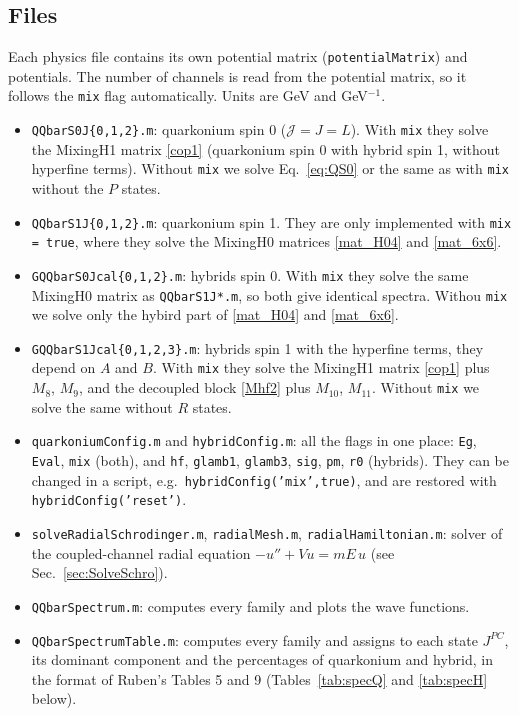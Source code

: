 \documentclass[11pt, a4paper]{article}
\begin{document}
\subsection{Files}
Each physics file contains its own potential matrix (\texttt{potentialMatrix}) and potentials. The number of channels is read from the potential matrix, so it follows the \texttt{mix} flag automatically. Units are GeV and GeV$^{-1}$.
\begin{itemize}
    \item \texttt{QQbarS0J\{0,1,2\}.m}: quarkonium spin 0 ($\mathcal{J}=J=L$). With \texttt{mix} they solve the MixingH1 matrix \eqref{cop1} (quarkonium spin 0 with hybrid spin 1, without hyperfine terms). Without \texttt{mix} we solve Eq.~\eqref{eq:QS0} or the same as with \texttt{mix} without the $P$ states.
    \item \texttt{QQbarS1J\{0,1,2\}.m}: quarkonium spin 1. They are only implemented with \texttt{mix = true}, where they solve the MixingH0 matrices \eqref{mat_H04} and \eqref{mat_6x6}.
    \item \texttt{GQQbarS0Jcal\{0,1,2\}.m}: hybrids spin 0. With \texttt{mix} they solve the same MixingH0 matrix as \texttt{QQbarS1J*.m}, so both give identical spectra. Withou \texttt{mix} we solve only the hybird part of \eqref{mat_H04} and \eqref{mat_6x6}.
    \item \texttt{GQQbarS1Jcal\{0,1,2,3\}.m}: hybrids spin 1 with the hyperfine terms, they depend on $A$ and $B$. With \texttt{mix} they solve the MixingH1 matrix \eqref{cop1} plus $M_8$, $M_9$, and the decoupled block \eqref{Mhf2} plus $M_{10}$, $M_{11}$. Without \texttt{mix} we solve the same without $R$ states.
    \item \texttt{quarkoniumConfig.m} and \texttt{hybridConfig.m}: all the flags in one place: \texttt{Eg}, \texttt{Eval}, \texttt{mix} (both), and \texttt{hf}, \texttt{glamb1}, \texttt{glamb3}, \texttt{sig}, \texttt{pm}, \texttt{r0} (hybrids). They can be changed in a script, e.g.\ \texttt{hybridConfig('mix',true)}, and are restored with \texttt{hybridConfig('reset')}.
    \item \texttt{solveRadialSchrodinger.m}, \texttt{radialMesh.m}, \texttt{radialHamiltonian.m}: solver of the coupled-channel radial equation $-u''+Vu=m E\, u$ (see Sec.~\ref{sec:SolveSchro}).
    \item \texttt{QQbarSpectrum.m}: computes every family and plots the wave functions.
    \item \texttt{QQbarSpectrumTable.m}: computes every family and assigns to each state $J^{PC}$, its dominant component and the percentages of quarkonium and hybrid, in the format of Ruben's Tables 5 and 9 (Tables~\ref{tab:specQ} and \ref{tab:specH} below).

\end{itemize}
\end{document}
